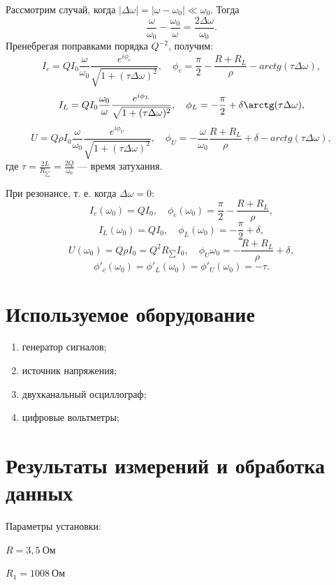 \documentclass[a4paper, 12pt]{article}
\begin{document}
Рассмотрим случай, когда $|\Delta\omega|=|\omega-\omega_0|\ll\omega_0$. Тогда
$$\frac{\omega}{\omega_0}-\frac{\omega_0}{\omega}=\frac{2\Delta\omega}{\omega_0}.$$
Пренебрегая поправками порядка $Q^{-2}$, получим:
$$I_c=QI_0\frac{\omega}{\omega_0}\frac{e^{i\phi_c}}{\sqrt{1+(\tau\Delta\omega)^2}}, \quad \phi_c=\frac{\pi}{2}-\frac{R+R_L}{\rho}-arctg(\tau\Delta\omega),$$
$$I_L=QI_0\frac{\omega_0}{\omega}\frac{e^{i\phi_L}}{\sqrt{1+(\tau\Delta\omega)^2}}, \quad \phi_L=-\frac{\pi}{2}+\delta\arctg(\tau\Delta\omega),$$
$$U=Q\rho I_0\frac{\omega}{\omega_0}\frac{e^{i\phi_U}}{\sqrt{1+(\tau\Delta\omega)^2}}, \quad \phi_U=-\frac{\omega}{\omega_0}\frac{R+R_L}{\rho}+\delta-arctg(\tau\Delta\omega),$$
где $\tau=\frac{2L}{R_{\sum}}=\frac{2Q}{\omega_0}$ --- время затухания.

При резонансе, т. е. когда $\Delta\omega=0$:
$$I_c(\omega_0)=QI_0, \quad \phi_c(\omega_0)=\frac{\pi}{2}-\frac{R+R_L}{\rho},$$
$$I_L(\omega_0)=QI_0, \quad \phi_L(\omega_0)=-\frac{\pi}{2}+\delta,$$
$$U(\omega_0)=Q\rho I_0=Q^2R_{\sum}I_0, \quad \phi_U{\omega_0}=-\frac{R+R_L}{\rho}+\delta,$$
$$\phi'_c(\omega_0)=\phi'_L(\omega_0)=\phi'_U(\omega_0)=-\tau.$$
  	
\section{Используемое оборудование}

\begin{enumerate}
    \item генератор сигналов;
    \item источник напряжения;
    \item двухканальный осциллограф;
    \item цифровые вольтметры;
\end{enumerate}

\section{Результаты измерений и обработка данных}

Параметры установки:
\begin{description}
\item{} $R = 3,5~Ом$
\item{} $R_1 = 1008~Ом$
\end{description}
\end{document}
